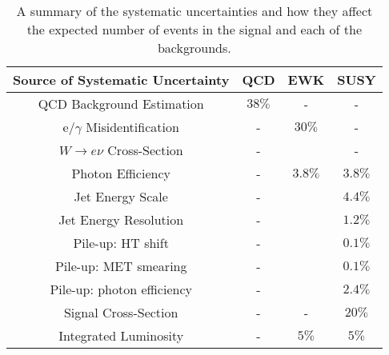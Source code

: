 \begin{table}
\begin{center}
\begin{tabular}{|c|c|c|c|}
\hline
{\bf Source of Systematic Uncertainty} & {\bf QCD} & {\bf EWK} & {\bf SUSY} \\
\hline
QCD Background Estimation & $38\unit{\%}$ & - & - \\
\hline
e/$\gamma$ Misidentification & - & $30\unit{\%}$ & - \\
\hline
$W\rightarrow e\nu$ Cross-Section & - &  & - \\
\hline
Photon Efficiency & - & $3.8\unit{\%}$ & $3.8\unit{\%}$ \\
\hline
Jet Energy Scale & - & & $4.4\unit{\%}$ \\
\hline
Jet Energy Resolution & - & & $1.2\unit{\%}$ \\
\hline
Pile-up: HT shift & - & & $0.1\unit{\%}$ \\
\hline
Pile-up: MET smearing & - & & $0.1\unit{\%}$ \\
\hline
Pile-up: photon efficiency & - & & $2.4\unit{\%}$ \\
\hline
Signal Cross-Section & - & - & $20\unit{\%}$ \\
\hline
Integrated Luminosity & - & $5\unit{\%}$ & $5\unit{\%}$ \\
\hline
\end{tabular}
\end{center}
\caption{A summary of the systematic uncertainties and how they affect the
expected number of events in the signal and each of the backgrounds.}
\label{tab:Systematics_Summary}
\end{table}
